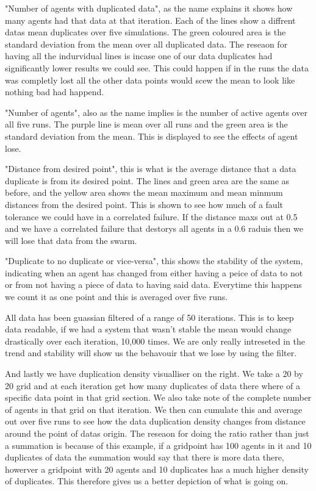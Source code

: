 \documentclass{UoYCSproject}
\begin{document}
"Number of agents with duplicated data", as the name explains it shows how many agents had that data at that iteration.
Each of the lines show a diffrent datas mean duplicates over five simulations.
The green coloured area is the standard deviation from the mean over all duplicated data.
The reseaon for having all the indurvidual lines is incase one of our data duplicates had significantly lower results we could see.
This could happen if in the runs the data was completly lost all the other data points would scew the mean to look like nothing bad had happend.

"Number of agents", also as the name implies is the number of active agents over all five runs.
The purple line is mean over all runs and the green area is the standard deviation from the mean.
This is displayed to see the effects of agent lose.

"Distance from desired point", this is what is the average distance that a data duplicate is from its desired point.
The lines and green area are the same as before, and the yellow area shows the mean maximum and mean minmum distances from the desired point.
This is shown to see how much of a fault tolerance we could have in a correlated failure.
If the distance maxs out at 0.5 and we have a correlated failure that destorys all agents in a 0.6 raduis then we will lose that data from the swarm.

"Duplicate to no duplicate or vice-versa", this shows the stability of the system, indicating when an agent has changed from either having a peice of data to not or from not having a piece of data to having said data.
Everytime this happens we count it as one point and this is averaged over five runs.

All data has been guassian filtered of a range of 50 iterations.
This is to keep data readable, if we had a system that wasn't stable the mean would change drastically over each iteration, 10,000 times.
We are only really intreseted in the trend and stability will show us the behavouir that we lose by using the filter.

And lastly we have duplication density visualliser on the right.
We take a 20 by 20 grid and at each iteration get how many duplicates of data there where of a specific data point in that grid section.
We also take note of the complete number of agents in that grid on that iteration.
We then can cumulate this and average out over five runs to see how the data duplication density changes from distance around the point of datas origin.
The reseaon for doing the ratio rather than just a summation is because of this example, if a gridpoint has 100 agents in it and 10 duplicates of data the summation would say that there is more data there, howerver a gridpoint with 20 agents and 10 duplicates has a much higher density of duplicates.
This therefore gives us a better depiction of what is going on.
\end{document}
